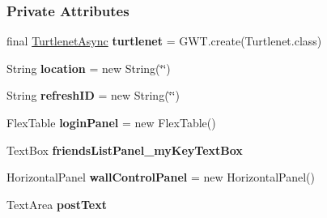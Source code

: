 \subsubsection*{Private Attributes}
\begin{DoxyCompactItemize}
\item 
\hypertarget{classballmerpeak_1_1turtlenet_1_1client_1_1frontend_aef6ce8b50c96dc1af6177f057c4b717f}{final \hyperlink{interfaceballmerpeak_1_1turtlenet_1_1client_1_1TurtlenetAsync}{Turtlenet\-Async} {\bfseries turtlenet} = G\-W\-T.\-create(Turtlenet.\-class)}\label{classballmerpeak_1_1turtlenet_1_1client_1_1frontend_aef6ce8b50c96dc1af6177f057c4b717f}

\item 
\hypertarget{classballmerpeak_1_1turtlenet_1_1client_1_1frontend_a7d6f7af35b97248a4c87681b56b247b6}{String {\bfseries location} = new String(\char`\"{}\char`\"{})}\label{classballmerpeak_1_1turtlenet_1_1client_1_1frontend_a7d6f7af35b97248a4c87681b56b247b6}

\item 
\hypertarget{classballmerpeak_1_1turtlenet_1_1client_1_1frontend_a280a54ef9864d0adbd9a44e32b7a4775}{String {\bfseries refresh\-I\-D} = new String(\char`\"{}\char`\"{})}\label{classballmerpeak_1_1turtlenet_1_1client_1_1frontend_a280a54ef9864d0adbd9a44e32b7a4775}

\item 
\hypertarget{classballmerpeak_1_1turtlenet_1_1client_1_1frontend_a8991d2d9a0c72e08986aa710d0e02278}{Flex\-Table {\bfseries login\-Panel} = new Flex\-Table()}\label{classballmerpeak_1_1turtlenet_1_1client_1_1frontend_a8991d2d9a0c72e08986aa710d0e02278}

\item 
\hypertarget{classballmerpeak_1_1turtlenet_1_1client_1_1frontend_a342dab1f72f4cf1660ec756f4180b331}{Text\-Box {\bfseries friends\-List\-Panel\-\_\-my\-Key\-Text\-Box}}\label{classballmerpeak_1_1turtlenet_1_1client_1_1frontend_a342dab1f72f4cf1660ec756f4180b331}

\item 
\hypertarget{classballmerpeak_1_1turtlenet_1_1client_1_1frontend_a7ec1c30337c5278194425a4fa458996b}{Horizontal\-Panel {\bfseries wall\-Control\-Panel} = new Horizontal\-Panel()}\label{classballmerpeak_1_1turtlenet_1_1client_1_1frontend_a7ec1c30337c5278194425a4fa458996b}

\item 
\hypertarget{classballmerpeak_1_1turtlenet_1_1client_1_1frontend_af105d0e6450c2caedeaee033e8f5d444}{Text\-Area {\bfseries post\-Text}}\label{classballmerpeak_1_1turtlenet_1_1client_1_1frontend_af105d0e6450c2caedeaee033e8f5d444}


\end{DoxyCompactItemize}
